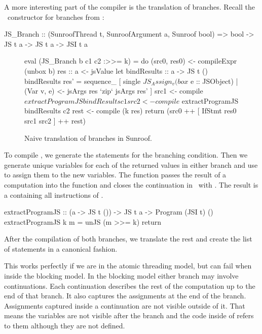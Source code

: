 A more interesting part of the compiler is the translation of branches.
Recall the \JSI~constructor for branches from :
\begin{Code}
JS_Branch :: (SunroofThread t, SunroofArgument a, Sunroof bool) 
          => bool -> JS t a -> JS t a  -> JSI t a
\end{Code}
\begin{figure}[h]
\begin{Code}
eval (JS_Branch b c1 c2 :>>= k) = do
  (src0, res0) <- compileExpr (unbox b)
  res :: a <- jsValue
  let bindResults :: a -> JS t ()
      bindResults res' =
        sequence_ [ single $ JS_Assign_ v (box $ e :: JSObject)
                  | (Var v, e) <- jsArgs res `zip` jsArgs res' ]
  src1 <- compile $ extractProgramJS bindResults c1
  src2 <- compile $ extractProgramJS bindResults c2
  rest <- compile (k res)
  return (src0 ++ [ IfStmt res0 src1 src2 ] ++ rest)
\end{Code}
\caption{Naive translation of branches in Sunroof.}
\label{fig:branch-translation}
\end{figure}
To compile ,
we generate the statements for the branching condition.
Then we generate unique variables for each of the returned values in 
either branch and use  to assign them to the 
new variables. The function  
passes the result of a computation  
into the function  and
closes the continuation in \JS~with .
The result is a  containing
all instructions of .
\begin{Code}
extractProgramJS :: (a -> JS t ()) -> JS t a -> Program (JSI t) ()
extractProgramJS k m = unJS (m >>= k) return
\end{Code}

After the compilation of both branches, we translate the 
rest and create the list of statements in a canonical fashion.

This works perfectly if we are in the atomic threading model,
but can fail when inside the blocking model. 
In the blocking model either branch 
may involve continuations. Each 
continuation describes the rest of the computation up
to the end of that branch. It also captures the 
assignments at the end of the branch. 
Assignments captured inside a continuation
are not visible outside of 
it. That means the variables are not visible 
after the branch and the code inside of  refers to them
although they are not defined.

